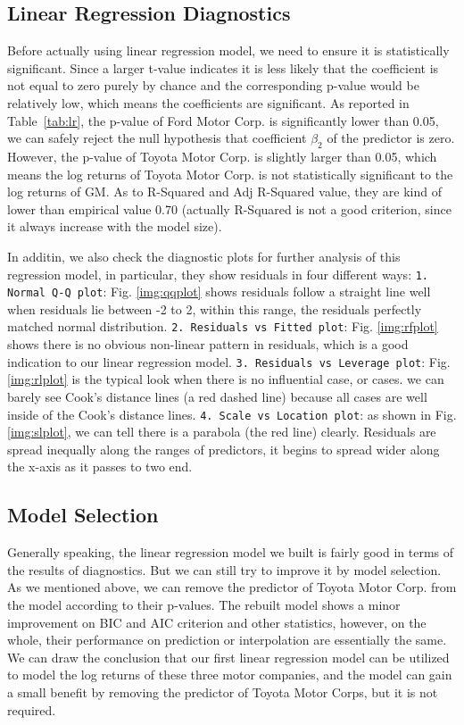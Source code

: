 \subsection{Linear Regression Diagnostics}

Before actually using linear regression model, we need to ensure it is statistically significant. Since a larger t-value indicates it is less likely that the coefficient is not equal to zero purely by chance and the corresponding p-value would be relatively low, which means the coefficients are significant. As reported in Table~\ref{tab:lr}, the p-value of Ford Motor Corp. is significantly lower than 0.05, we can safely reject the null hypothesis that coefficient $\beta_2$ of the predictor is zero. However, the p-value of Toyota Motor Corp. is slightly larger than 0.05, which means the log returns of Toyota Motor Corp. is not statistically significant to the log returns of GM. As to R-Squared and Adj R-Squared value, they are kind of lower than empirical value 0.70 (actually R-Squared is not a good criterion, since it always increase with the model size).

In additin, we also check the diagnostic plots for further analysis of this regression model, in particular, they show residuals in four different ways: \texttt{1. Normal Q-Q plot}: Fig. \ref{img:qqplot} shows residuals follow a straight line well when residuals lie between -2 to 2, within this range, the residuals perfectly matched normal distribution. \texttt{2. Residuals vs Fitted plot}: 
Fig. \ref{img:rfplot} shows there is no obvious non-linear pattern in residuals, which is a good indication to our linear regression model. \texttt{3. Residuals vs Leverage plot}: Fig. \ref{img:rlplot} is the typical look when there is no influential case, or cases. we can barely see Cook's distance lines (a red dashed line) because all cases are well inside of the Cook's distance lines. \texttt{4. Scale vs Location plot}: as shown in Fig. \ref{img:slplot}, we can tell there is a parabola (the red line) clearly. Residuals are spread inequally along the ranges of predictors, it begins to spread wider along the x-axis as it passes to two end. 

\subsection{Model Selection}

Generally speaking, the linear regression model we built is fairly good in terms of the results of diagnostics. But we can still try to improve it by model selection. As we mentioned above, we can remove the predictor of Toyota Motor Corp. from the model according to their p-values. The rebuilt model shows a minor improvement on BIC and AIC criterion and other statistics, however, on the whole, their performance on prediction or interpolation are essentially the same. We can draw the conclusion that our first linear regression model can be utilized to model the log returns of these three motor companies, and the model can gain a small benefit by removing the predictor of Toyota Motor Corps, but it is not required. 


